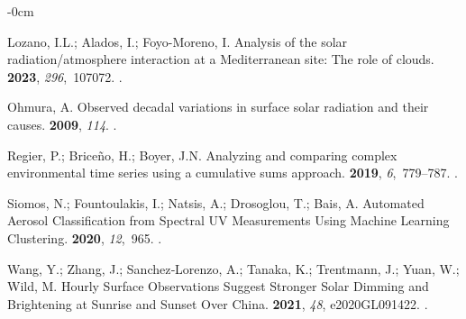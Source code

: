 \documentclass[applsci,article,accept,moreauthors,pdftex]{Definitions/mdpi}
\begin{document}
\begin{adjustwidth}{-\extralength}{0cm}
\begin{thebibliography}{999}
Lozano, I.L.; Alados, I.; Foyo-Moreno, I.
\newblock Analysis of the solar radiation/atmosphere interaction at a
  Mediterranean site: The role of clouds.
 {\bf 2023}, {\em 296},~107072.
.

Ohmura, A.
\newblock Observed decadal variations in surface solar radiation and their
  causes.
 {\bf 2009}, {\em 114}.
.

Regier, P.; Brice{\~{n}}o, H.; Boyer, J.N.
\newblock Analyzing and comparing complex environmental time series using a
  cumulative sums approach.
 {\bf 2019}, {\em 6},~779--787.
.

Siomos, N.; Fountoulakis, I.; Natsis, A.; Drosoglou, T.; Bais, A.
\newblock Automated Aerosol Classification from Spectral {UV} Measurements
  Using Machine Learning Clustering.
 {\bf 2020}, {\em 12},~965.
.

Wang, Y.; Zhang, J.; Sanchez‐Lorenzo, A.; Tanaka, K.; Trentmann, J.; Yuan,
  W.; Wild, M.
\newblock Hourly Surface Observations Suggest Stronger Solar Dimming and
  Brightening at Sunrise and Sunset Over China.
 {\bf 2021}, {\em 48}, e2020GL091422.
.

\end{thebibliography}

%

\PublishersNote{}
\end{adjustwidth}
\end{document}
